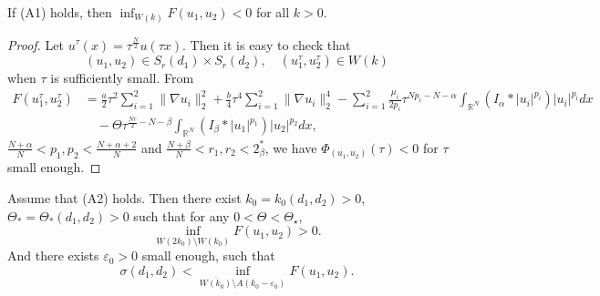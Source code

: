 \documentclass[reqno]{amsart}
\begin{document}
\begin{lemma}\label{fud}
If {\rm (A1)} holds, then $\inf_{W(k)}F(u_1,u_2)<0$ for all $k>0$.
\end{lemma}

\begin{proof}
Let $u^{\tau}(x)=\tau^{\frac{N}{2}}u(\tau x)$. Then it is easy to check that
\[
(u_1,u_2)\in S_r(d_1)\times S_r(d_2), \quad
 (u_1^{\tau},u_2^{\tau})\in W(k)
\]
when $\tau$ is sufficiently small.
From
\begin{align*}
F(u_1^{\tau},u_2^{\tau})
&= \frac{a}{2}\tau^2\sum_{i=1}^2\| \nabla u_i\|_2^2+\frac{b}{4}\tau^4\sum_{i=1}^2\|
 \nabla u_i\|_2^4-\sum_{i=1}^2\frac{\mu_i}{2p_i}\tau^{N{p_i}-N-\alpha}
  \int_{\mathbb{R}^N}(I_\alpha\ast|u_i|^{p_i})|u_i|^{p_i}dx\\
&\quad -\Theta\tau^{\frac{Nr}{2}-N-\beta}\int_{\mathbb{R}^N}(I_\beta\ast|u_1|^{p_1})
 |u_2|^{p_2}dx,
\end{align*}
$\frac{N+\alpha}{N}<p_1,p_2<\frac{N+\alpha+2}{N}$ and 
$\frac{N+\beta}{N}<r_1,r_2<2_\beta^*$, we have $\Phi_{(u_1,u_2)}(\tau) <0$ for
 $\tau$ small enough.
\end{proof}

\begin{lemma}\label{dx5}
Assume that {\rm (A2)} holds. Then there exist $k_0=k_0(d_1,d_2)>0$, 
$\Theta_*=\Theta_*(d_1,d_2)>0$ such that for any $0<\Theta<\Theta_\star$,
\[
\inf_{W(2k_0)\setminus W(k_0)}F(u_1,u_2)>0.
\]
And there exists $\varepsilon_0>0$ small enough, such that
\[
\sigma(d_1,d_2)<\inf_{\overline{W(k_0)}\setminus A(k_0-\varepsilon_0)}F(u_1,u_2).
\]
\end{lemma}
\end{document}
